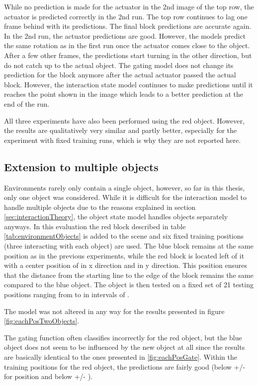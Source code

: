 While no prediction is made for the actuator in the 2nd image of the top row, the actuator is predicted correctly in the 2nd run. The top row continues to lag one frame behind with its predictions. The final block predictions are accurate again.
In the 2nd run, the actuator predictions are good. However, the models predict the same rotation as in the first run once the actuator comes close to the object. After a few other frames, the predictions start turning in the other direction, but do not catch up to the actual object. The gating model does not change its prediction for the block anymore after the actual actuator passed the actual block. However, the interaction state model continues to make predictions until it reaches the point shown in the image which leads to a better prediction at the end of the run.

All three experiments have also been performed using the red object. However, the results are qualitatively very similar and partly better, especially for the experiment with fixed training runs, which is why they are not reported here.

\subsection{Extension to multiple objects \label{sec:multipleObjects}}

Environments rarely only contain a single object, however, so far in this thesis, only one object was considered. While it is difficult for the interaction model to handle multiple objects due to the reasons explained in section \ref{sec:interactionTheory}, the object state model handles objects separately anyways. In this evaluation the red block described in table \ref{tab:environmentObjects} is added to the scene and six fixed training positions (three interacting with each object) are used. The blue block remains at the same position as in the previous experiments, while the red block is located left of it with a center position of  in x direction and  in y direction. This position ensures that the distance from the starting line to the edge of the block remains the same compared to the blue object.
The object is then tested on a fixed set of 21 testing positions ranging from  to  in intervals of .


The model was not altered in any way for the results presented in figure \ref{fig:eachPosTwoObjects}.

The gating function often classifies incorrectly for the red object, but the blue object does not seem to be influenced by the new object at all since the results are basically identical to the ones presented in \ref{fig:eachPosGate}. 
Within the training positions for the red object, the predictions are fairly good (below  +/-  for position and below  +/- ).

